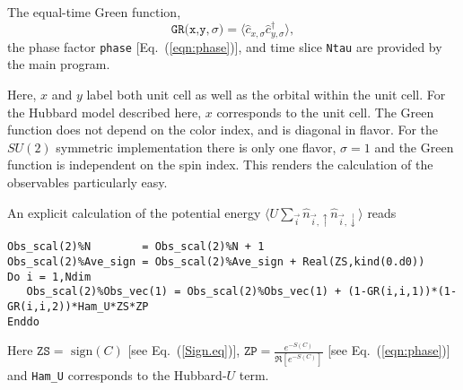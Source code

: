 The equal-time  Green function,
\begin{equation}
	 \texttt{GR(x,y},\sigma{\texttt)}  = \langle \hat{c}^{\phantom{\dagger}}_{x,\sigma} \hat{c}^{\dagger}_{y,\sigma}  \rangle,
\end{equation}
the  phase factor \texttt{phase} [Eq.~(\ref{eqn:phase})], and time slice \texttt{Ntau}   are provided by the main program.  

Here,   $x$ and $y$ label  both unit cell as well as the orbital within the unit cell. For the Hubbard model described here, $x$ corresponds to the unit cell.  The Green function  does not depend on the color index, and is diagonal in flavor.  For the $SU(2)$ symmetric implementation  there is only one flavor, $\sigma = 1$ and the Green function is  independent on the spin index.  This renders the calculation of the observables particularly easy.   

An explicit calculation of the   potential energy  $ \langle U \sum_{\vec{i}}  \hat{n}_{\vec{i},\uparrow}   \hat{n}_{\vec{i},\downarrow}  \rangle $ reads 
\begin{lstlisting}[style=fortran]
Obs_scal(2)%N        = Obs_scal(2)%N + 1
Obs_scal(2)%Ave_sign = Obs_scal(2)%Ave_sign + Real(ZS,kind(0.d0))
Do i = 1,Ndim
   Obs_scal(2)%Obs_vec(1) = Obs_scal(2)%Obs_vec(1) + (1-GR(i,i,1))*(1-GR(i,i,2))*Ham_U*ZS*ZP
Enddo
\end{lstlisting} 
Here  $ \texttt{ZS} = \text{ sign} (C) $  [see Eq.~(\ref{Sign.eq})],  $ \texttt{ZP} =   \frac{e^{-S(C)}} {\Re \left[e^{-S(C)} \right]}   $ [see Eq.~(\ref{eqn:phase})] and  \texttt{Ham\_U}  corresponds to the Hubbard-$U$ term.

